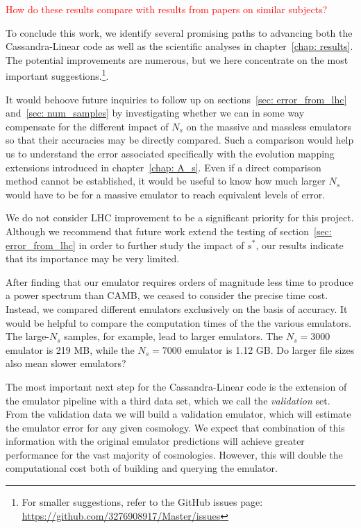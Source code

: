 \textcolor{red}{How do these results compare with results from 
papers on similar subjects?}


To conclude this work, we identify several promising paths to advancing
both the Cassandra-Linear code as well as the scientific analyses in
chapter~\ref{chap: results}. The potential improvements are
numerous, but we here concentrate on the most important
suggestions.\footnote{For smaller suggestions, refer to the GitHub issues 
page: \url{https://github.com/3276908917/Master/issues}}.


It would behoove future inquiries to follow up on
sections~\ref{sec: error_from_lhc} and~\ref{sec: num_samples} by investigating 
whether we
can in some way compensate for the different impact of $N_s$ on the massive
and massless emulators so that their accuracies may be directly compared.
Such a comparison would help us to understand the error associated
specifically with the evolution mapping extensions introduced in
chapter~\ref{chap: A_s}. Even if a direct comparison method cannot be
established, it would be useful to know how much larger $N_s$ would have to
be for a massive emulator to reach equivalent levels of error.

We do not consider LHC improvement to be a significant
priority for this project. Although we recommend that future work extend the
testing of section~\ref{sec: error_from_lhc} in order to further study the
impact of $s^*$, our results indicate that its importance may be very limited. 

After finding that our emulator requires orders of magnitude less
time to produce a power spectrum than CAMB, we ceased to consider the precise
time cost. Instead, we compared different emulators exclusively on the
basis of accuracy. It would be helpful to compare the computation times of the
the various emulators. The large-$N_s$ samples, for example, lead to larger
emulators. The $N_s = 3000$ emulator is 219 MB, while the $N_s = 7000$
emulator is 1.12 GB. Do larger file sizes also mean slower emulators?


The most important next step for the Cassandra-Linear code is the
extension of the emulator pipeline with a third data set, which we call the
\textit{validation} set. From the validation data we will build a validation
emulator, which will estimate the emulator error for any given cosmology.
We expect that combination of this information with the original emulator
predictions will achieve greater performance for the vast majority of
cosmologies. However, this will double the
computational cost both of building and querying the emulator.

